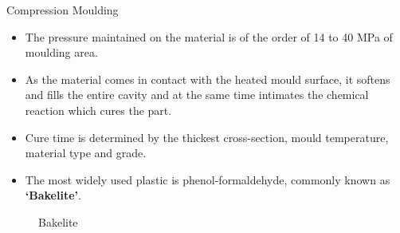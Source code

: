 \documentclass[11pt,t]{beamer}
\begin{document}
\begin{frame}[allowframebreaks]{Compression Moulding}
        ~\\
        \begin{minipage}{0.6\textwidth}
            \begin{itemize}
                \item The pressure maintained on the material is of the order of 14 to 40 MPa of moulding area.
                \item As the material comes in contact with the heated mould surface, it softens and fills the entire
                cavity and at the same time intimates the chemical reaction which cures the part.
                \item Cure time is determined by the thickest cross-section, mould temperature, material type and grade.
                \item The most widely used plastic is phenol-formaldehyde, commonly known as \textbf{`Bakelite'}.
            \end{itemize}
        \end{minipage}
        \begin{minipage}{0.385\textwidth}
            \begin{center}
                \begin{figure}
                    \caption{\smallsize Bakelite}\label{fig:fig-3}
                \end{figure}
            \end{center}
        \end{minipage}
    \end{frame}
\end{document}
